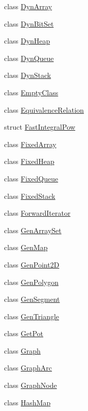 \begin{DoxyCompactItemize}
class \hyperlink{class_designar_1_1_dyn_array}{Dyn\+Array}
\item 
class \hyperlink{class_designar_1_1_dyn_bit_set}{Dyn\+Bit\+Set}
\item 
class \hyperlink{class_designar_1_1_dyn_heap}{Dyn\+Heap}
\item 
class \hyperlink{class_designar_1_1_dyn_queue}{Dyn\+Queue}
\item 
class \hyperlink{class_designar_1_1_dyn_stack}{Dyn\+Stack}
\item 
class \hyperlink{class_designar_1_1_empty_class}{Empty\+Class}
\item 
class \hyperlink{class_designar_1_1_equivalence_relation}{Equivalence\+Relation}
\item 
struct \hyperlink{struct_designar_1_1_fast_integral_pow}{Fast\+Integral\+Pow}
\item 
class \hyperlink{class_designar_1_1_fixed_array}{Fixed\+Array}
\item 
class \hyperlink{class_designar_1_1_fixed_heap}{Fixed\+Heap}
\item 
class \hyperlink{class_designar_1_1_fixed_queue}{Fixed\+Queue}
\item 
class \hyperlink{class_designar_1_1_fixed_stack}{Fixed\+Stack}
\item 
class \hyperlink{class_designar_1_1_forward_iterator}{Forward\+Iterator}
\item 
class \hyperlink{class_designar_1_1_gen_array_set}{Gen\+Array\+Set}
\item 
class \hyperlink{class_designar_1_1_gen_map}{Gen\+Map}
\item 
class \hyperlink{class_designar_1_1_gen_point2_d}{Gen\+Point2D}
\item 
class \hyperlink{class_designar_1_1_gen_polygon}{Gen\+Polygon}
\item 
class \hyperlink{class_designar_1_1_gen_segment}{Gen\+Segment}
\item 
class \hyperlink{class_designar_1_1_gen_triangle}{Gen\+Triangle}
\item 
class \hyperlink{class_designar_1_1_get_pot}{Get\+Pot}
\item 
class \hyperlink{class_designar_1_1_graph}{Graph}
\item 
class \hyperlink{class_designar_1_1_graph_arc}{Graph\+Arc}
\item 
class \hyperlink{class_designar_1_1_graph_node}{Graph\+Node}
\item 
class \hyperlink{class_designar_1_1_hash_map}{Hash\+Map}
\item 

\end{DoxyCompactItemize}
